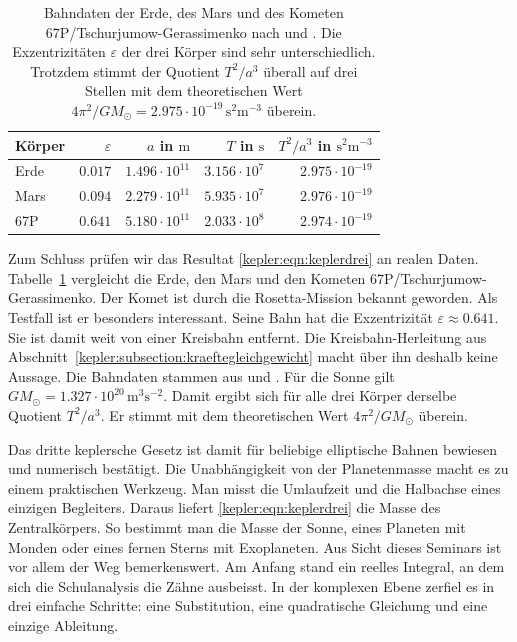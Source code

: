 \begin{table}
\centering
\begin{tabular}{lrrrr}
Körper & $\varepsilon$ & $a$ in $\text{m}$ & $T$ in $\text{s}$
& $T^2/a^3$ in $\text{s}^2\text{m}^{-3}$
\\
\hline
Erde   & $0.017$ & $1.496\cdot 10^{11}$ & $3.156\cdot 10^{7}$
& $2.975\cdot 10^{-19}$
\\
Mars   & $0.094$ & $2.279\cdot 10^{11}$ & $5.935\cdot 10^{7}$
& $2.976\cdot 10^{-19}$
\\
67P    & $0.641$ & $5.180\cdot 10^{11}$ & $2.033\cdot 10^{8}$
& $2.974\cdot 10^{-19}$
\end{tabular}
\caption{Bahndaten der Erde, des Mars und des Kometen
67P/Tschurjumow-Gerassimenko nach \cite{kepler:nasafactsheet} und
%
%
%
%
\cite{kepler:jplsbdb}.
Die Exzentrizitäten $\varepsilon$ der drei Körper sind sehr unterschiedlich.
Trotzdem stimmt der Quotient $T^2/a^3$ überall auf drei Stellen mit
dem theoretischen Wert
$4\pi^2/GM_{\odot}=2.975\cdot 10^{-19}\,\text{s}^2\text{m}^{-3}$
überein.
\label{kepler:table:plausibilisierung}}
\end{table}

Zum Schluss prüfen wir das Resultat \eqref{kepler:eqn:keplerdrei} an realen Daten.
Tabelle~\ref{kepler:table:plausibilisierung} vergleicht die Erde, den Mars und den Kometen 67P/Tschurjumow-Gerassimenko.
Der Komet ist durch die Rosetta-Mission bekannt geworden.
Als Testfall ist er besonders interessant.
Seine Bahn hat die Exzentrizität $\varepsilon\approx 0.641$.
Sie ist damit weit von einer Kreisbahn entfernt.
Die Kreisbahn-Herleitung aus Abschnitt~\ref{kepler:subsection:kraeftegleichgewicht} macht über ihn deshalb keine Aussage.
Die Bahndaten stammen aus \cite{kepler:nasafactsheet} und \cite{kepler:jplsbdb}.
Für die Sonne gilt $GM_{\odot}=1.327\cdot 10^{20}\,\text{m}^3\text{s}^{-2}$.
Damit ergibt sich für alle drei Körper derselbe Quotient $T^2/a^3$.
Er stimmt mit dem theoretischen Wert $4\pi^2/GM_{\odot}$ überein.

Das dritte keplersche Gesetz ist damit für beliebige elliptische Bahnen bewiesen und numerisch bestätigt.
Die Unabhängigkeit von der Planetenmasse macht es zu einem praktischen Werkzeug.
Man misst die Umlaufzeit und die Halbachse eines einzigen Begleiters.
Daraus liefert \eqref{kepler:eqn:keplerdrei} die Masse des Zentralkörpers.
So bestimmt man die Masse der Sonne, eines Planeten mit Monden oder eines fernen Sterns mit Exoplaneten.
Aus Sicht dieses Seminars ist vor allem der Weg bemerkenswert.
Am Anfang stand ein reelles Integral, an dem sich die Schulanalysis die Zähne ausbeisst.
In der komplexen Ebene zerfiel es in drei einfache Schritte: eine Substitution, eine quadratische Gleichung und eine einzige Ableitung.
